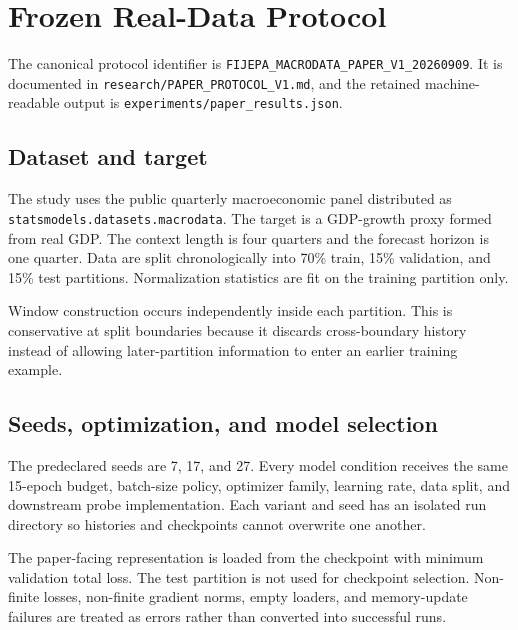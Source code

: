 \documentclass[11pt]{article}
\begin{document}
\section{Frozen Real-Data Protocol}
The canonical protocol identifier is \texttt{FIJEPA\_MACRODATA\_PAPER\_V1\_20260909}. It is documented in \texttt{research/PAPER\_PROTOCOL\_V1.md}, and the retained machine-readable output is \texttt{experiments/paper\_results.json}.

\subsection{Dataset and target}
The study uses the public quarterly macroeconomic panel distributed as \texttt{statsmodels.datasets.macrodata}. The target is a GDP-growth proxy formed from real GDP. The context length is four quarters and the forecast horizon is one quarter. Data are split chronologically into 70\% train, 15\% validation, and 15\% test partitions. Normalization statistics are fit on the training partition only.

Window construction occurs independently inside each partition. This is conservative at split boundaries because it discards cross-boundary history instead of allowing later-partition information to enter an earlier training example.

\subsection{Seeds, optimization, and model selection}
The predeclared seeds are 7, 17, and 27. Every model condition receives the same 15-epoch budget, batch-size policy, optimizer family, learning rate, data split, and downstream probe implementation. Each variant and seed has an isolated run directory so histories and checkpoints cannot overwrite one another.

The paper-facing representation is loaded from the checkpoint with minimum validation total loss. The test partition is not used for checkpoint selection. Non-finite losses, non-finite gradient norms, empty loaders, and memory-update failures are treated as errors rather than converted into successful runs.
\end{document}
